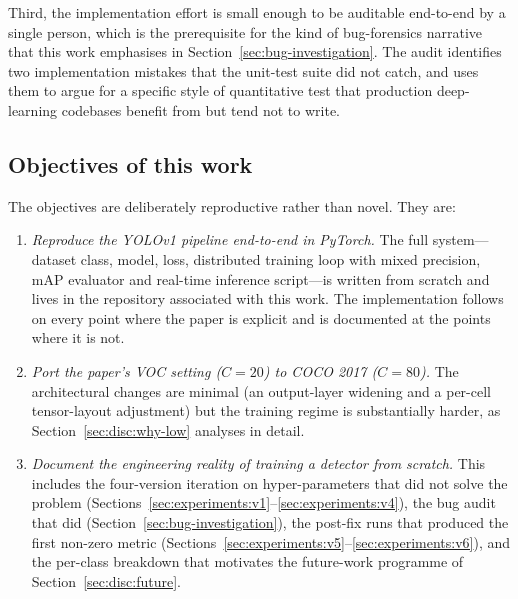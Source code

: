 Third, the implementation effort is small enough to be auditable
end-to-end by a single person, which is the prerequisite for the kind of
bug-forensics narrative that this work emphasises in
Section~\ref{sec:bug-investigation}. The audit identifies two implementation
mistakes that the unit-test suite did not catch, and uses them to argue for
a specific style of quantitative test that production deep-learning codebases
benefit from but tend not to write.

\subsection{Objectives of this work}
\label{sec:intro:objectives}

The objectives are deliberately reproductive rather than novel. They are:

\begin{enumerate}
    \item \emph{Reproduce the YOLOv1 pipeline end-to-end in PyTorch.} The
        full system---dataset class, model, loss, distributed training loop
        with mixed precision, mAP evaluator and real-time inference
        script---is written from scratch and lives in the repository
        associated with this work. The implementation follows
        \citet{redmon2016you} on every point where the paper is explicit and
        is documented at the points where it is not.
    \item \emph{Port the paper's VOC setting ($C = 20$) to COCO 2017
        ($C = 80$).} The architectural changes are minimal (an output-layer
        widening and a per-cell tensor-layout adjustment) but the training
        regime is substantially harder, as Section~\ref{sec:disc:why-low}
        analyses in detail.
    \item \emph{Document the engineering reality of training a detector from
        scratch.} This includes the four-version iteration on hyper-parameters
        that did not solve the problem
        (Sections~\ref{sec:experiments:v1}--\ref{sec:experiments:v4}), the
        bug audit that did (Section~\ref{sec:bug-investigation}), the
        post-fix runs that produced the first non-zero metric
        (Sections~\ref{sec:experiments:v5}--\ref{sec:experiments:v6}), and
        the per-class breakdown that motivates the future-work programme of
        Section~\ref{sec:disc:future}.
\end{enumerate}

